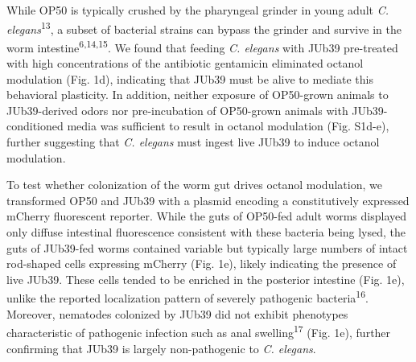 \documentclass[11pt,]{article}
\begin{document}
While OP50 is typically crushed by the pharyngeal grinder in young adult
\textit{C. elegans}\textsuperscript{13}, a subset of bacterial strains
can bypass the grinder and survive in the worm
intestine\textsuperscript{6,14,15}. We found that feeding
\textit{C. elegans} with JUb39 pre-treated with high concentrations of
the antibiotic gentamicin eliminated octanol modulation (Fig. 1d),
indicating that JUb39 must be alive to mediate this behavioral
plasticity. In addition, neither exposure of OP50-grown animals to
JUb39-derived odors nor pre-incubation of OP50-grown animals with
JUb39-conditioned media was sufficient to result in octanol modulation
(Fig. S1d-e), further suggesting that \textit{C. elegans} must ingest
live JUb39 to induce octanol modulation.

To test whether colonization of the worm gut drives octanol modulation,
we transformed OP50 and JUb39 with a plasmid encoding a constitutively
expressed mCherry fluorescent reporter. While the guts of OP50-fed adult
worms displayed only diffuse intestinal fluorescence consistent with
these bacteria being lysed, the guts of JUb39-fed worms contained
variable but typically large numbers of intact rod-shaped cells
expressing mCherry (Fig. 1e), likely indicating the presence of live
JUb39. These cells tended to be enriched in the posterior intestine
(Fig. 1e), unlike the reported localization pattern of severely
pathogenic bacteria\textsuperscript{16}. Moreover, nematodes colonized
by JUb39 did not exhibit phenotypes characteristic of pathogenic
infection such as anal swelling\textsuperscript{17} (Fig. 1e), further
confirming that JUb39 is largely non-pathogenic to \textit{C. elegans}.
\end{document}
